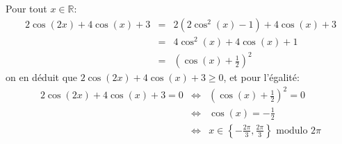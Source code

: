 Pour tout $x\in\mathbb{R}$:
\begin{eqnarray*}
  2\cos(2x)+4\cos(x)+3 &=& 2\left( 2\cos^2(x)-1\right)+4\cos(x)+3 \\
  &=& 4\cos^2(x)+4\cos(x)+1 \\
  &=& \left(\cos(x)+\frac{1}{2}\right)^2
\end{eqnarray*}
 on en déduit que $2\cos(2x)+4\cos(x)+3 \geq 0$, et pour l'égalité:
 \begin{eqnarray*}
   2\cos(2x)+4\cos(x)+3 = 0 &\Leftrightarrow & \left(\cos(x)+\frac{1}{2}\right)^2 = 0 \\
   & \Leftrightarrow & \cos(x) = -\frac{1}{2} \\
   & \Leftrightarrow & x\in \left\lbrace -\frac{2\pi}{3}, \frac{2\pi}{3} \right\rbrace \textrm{ modulo } 2\pi
 \end{eqnarray*}
